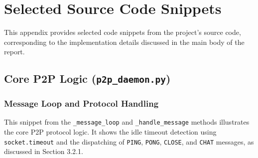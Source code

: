 \appendix
\section{Selected Source Code Snippets}
\label{appendix:code}

This appendix provides selected code snippets from the project's source code, corresponding to the implementation details discussed in the main body of the report.



\lstset{style=mystyle}

\subsection{Core P2P Logic (\texttt{p2p\_daemon.py})}
\label{sec:appendix_p2p_daemon}

\subsubsection{Message Loop and Protocol Handling}
\label{subsec:appendix_message_loop}
This snippet from the \texttt{\_message\_loop} and \texttt{\_handle\_message} methods illustrates the core P2P protocol logic. It shows the idle timeout detection using \texttt{socket.timeout} and the dispatching of \texttt{PING}, \texttt{PONG}, \texttt{CLOSE}, and \texttt{CHAT} messages, as discussed in Section 3.2.1.

